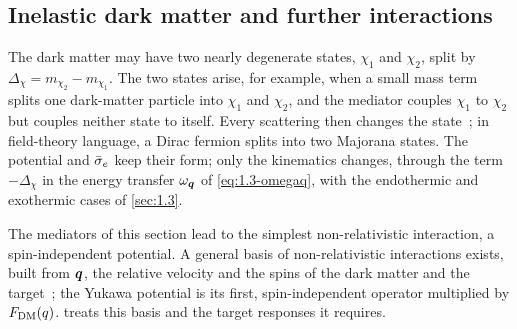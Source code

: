 \subsection{Inelastic dark matter and further interactions}

The dark matter may have two nearly degenerate states, $\chi_1$ and $\chi_2$, split by $\Delta_\chi = m_{\chi_2} - m_{\chi_1}$. The two states arise, for example, when a small mass term splits one dark-matter particle into $\chi_1$ and $\chi_2$, and the mediator couples $\chi_1$ to $\chi_2$ but couples neither state to itself. Every scattering then changes the state~\cite{tuckersmith2001inelastic}; in field-theory language, a Dirac fermion splits into two Majorana states. The potential and $\bar{\sigma}_{e}$ keep their form; only the kinematics changes, through the term $-\Delta_\chi$ in the energy transfer $\omega_{\bm{q}}$ of \cref{eq:1.3-omegaq}, with the endothermic and exothermic cases of \cref{sec:1.3}.

The mediators of this section lead to the simplest non-relativistic interaction, a spin-independent potential. A general basis of non-relativistic interactions exists, built from $\bm{q}$, the relative velocity and the spins of the dark matter and the target~\cite{fitzpatrick2013effective}; the Yukawa potential is its first, spin-independent operator multiplied by $F_{\mathrm{DM}}(q)$.  treats this basis and the target responses it requires.
